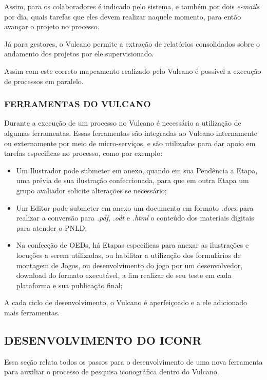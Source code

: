 \documentclass[
  12pt,            %
  openany,
  oneside,
  a4paper,         %
  english,      %
  brazil
]{article}
\numberwithin{figure}{section}
\numberwithin{table}{section}
\begin{document}
Assim, para os colaboradores é indicado pelo sistema, e também por dois \textit{e-mails} por dia, quais tarefas que eles devem realizar naquele momento, para então avançar o projeto no processo.

Já para gestores, o Vulcano permite a extração de relatórios consolidados sobre o andamento dos projetos por ele supervisionado.

Assim com este correto mapeamento realizado pelo Vulcano é possível a execução de processos em paralelo.


\subsubsection{FERRAMENTAS DO VULCANO}

Durante a execução de um processo no Vulcano é necessário a utilização de algumas ferramentas. Essas ferramentas são integradas ao Vulcano internamente ou externamente por meio de micro-serviços, e são utilizadas para dar apoio em tarefas especificas no processo, como por exemplo:

\begin{itemize}
  \item Um Ilustrador pode submeter em anexo, quando em sua Pendência a Etapa, uma prévia de sua ilustração confeccionada, para que em outra Etapa um grupo avaliador solicite alterações se necessário;
  \item Um Editor pode submeter em anexo um documento em formato \emph{.docx} para realizar a conversão para \emph{.pdf}, \emph{.odt} e \emph{.html} o conteúdo dos materiais digitais para atender o PNLD;
  \item Na confecção de OEDs, há Etapas especificas para anexar as ilustrações e locuções a serem utilizadas, ou habilitar a utilização dos formulários de montagem de Jogos, ou desenvolvimento do jogo por um desenvolvedor, download do formato executável, a fim realizar de seu teste em cada plataforma e sua publicação final;
\end{itemize}

A cada ciclo de desenvolvimento, o Vulcano é aperfeiçoado e a ele adicionado mais ferramentas.


\subsection{DESENVOLVIMENTO DO ICONR}

Essa seção relata todos os passos para o desenvolvimento de uma nova ferramenta para auxiliar o processo de pesquisa iconográfica dentro do Vulcano.
\end{document}
